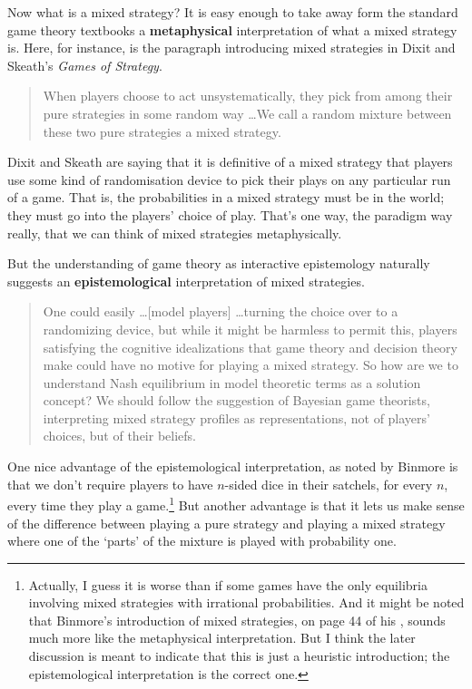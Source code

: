 Now what is a mixed strategy? It is easy enough to take away form the standard game theory textbooks a \textbf{metaphysical} interpretation of what a mixed strategy is. Here, for instance, is the paragraph introducing mixed strategies in Dixit and Skeath's \textit{Games of Strategy}.

\begin{quote}
When players choose to act unsystematically, they pick from among their pure strategies in some random way \dots We call a random mixture between these two pure strategies a mixed strategy. \citep[186]{DixitSkeath2004}
\end{quote}
Dixit and Skeath are saying that it is definitive of a mixed strategy that players use some kind of randomisation device to pick their plays on any particular run of a game. That is, the probabilities in a mixed strategy must be in the world; they must go into the players' choice of play. That's one way, the paradigm way really, that we can think of mixed strategies metaphysically.

But the understanding of game theory as interactive epistemology naturally suggests an \textbf{epistemological} interpretation of mixed strategies. %

\begin{quote}One could easily \dots [model players] \dots turning the choice over to a randomizing device, but while it might be harmless to permit this, players satisfying the cognitive idealizations that game theory and decision theory make could have no motive for playing a mixed strategy. So how are we to understand Nash equilibrium in model theoretic terms as a solution concept? We should follow the suggestion of Bayesian game theorists, interpreting mixed strategy profiles as representations, not of players' choices, but of their beliefs. \citep[57-8]{Stalnaker1994}
\end{quote}
One nice advantage of the epistemological interpretation, as noted by Binmore \citeyearpar[185]{Binmore2007} is that we don't require players to have $n$-sided dice in their satchels, for every $n$, every time they play a game.\footnote{Actually, I guess it is worse than if some games have the only equilibria involving mixed strategies with irrational probabilities. And it might be noted that Binmore's introduction of mixed strategies, on page 44 of his \citeyearpar{Binmore2007}, sounds much more like the metaphysical interpretation. But I think the later discussion is meant to indicate that this is just a heuristic introduction; the epistemological interpretation is the correct one.} But another advantage is that it lets us make sense of the difference between playing a pure strategy and playing a mixed strategy where one of the `parts' of the mixture is played with probability one. 

